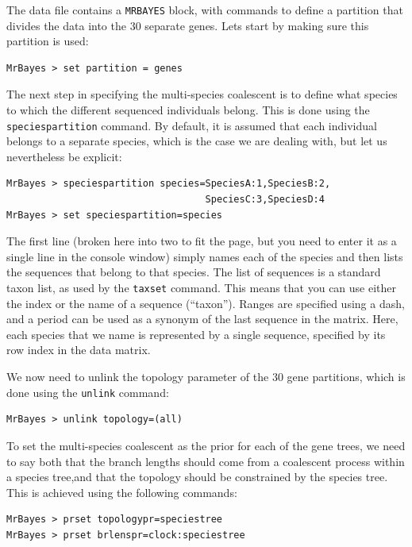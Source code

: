 \documentclass[12pt]{book}
\begin{document}
The data file contains a \texttt{MRBAYES} block, with commands to define a partition that divides
the data into the 30 separate genes. Lets start by making sure this partition is used:

\begin{Verbatim}
MrBayes > set partition = genes
\end{Verbatim}

The next step in specifying the multi-species coalescent is to define what species to which the
different sequenced individuals belong. This is done using the \texttt{speciespartition} command.
By default, it is assumed that each individual belongs to a separate species, which is the case we
are dealing with, but let us nevertheless be explicit:

\begin{Verbatim}
MrBayes > speciespartition species=SpeciesA:1,SpeciesB:2,
                                   SpeciesC:3,SpeciesD:4
MrBayes > set speciespartition=species
\end{Verbatim}

The first line (broken here into two to fit the page, but you need to enter it as a single line in
the console window) simply names each of the species and then lists the sequences that belong to
that species. The list of sequences is a standard taxon list, as used by the \texttt{taxset}
command.  This means that you can use either the index or the name of a sequence (``taxon'').
Ranges are specified using a dash, and a period can be used as a synonym of the last sequence in
the matrix.  Here, each species that we name is represented by a single sequence, specified by its
row index in the data matrix.

We now need to unlink the topology parameter of the 30 gene partitions, which is done using the
\texttt{unlink} command:

\begin{Verbatim}
MrBayes > unlink topology=(all)
\end{Verbatim}

To set the multi-species coalescent as the prior for each of the gene trees, we need to say both
that the branch lengths should come from a coalescent process within a species tree,and that the
topology should be constrained by the species tree. This is achieved using the following commands:

\begin{Verbatim}
MrBayes > prset topologypr=speciestree
MrBayes > prset brlenspr=clock:speciestree
\end{Verbatim}
\end{document}
